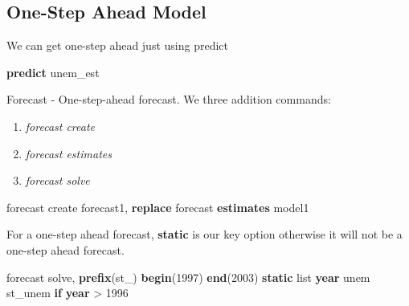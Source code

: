 \documentclass[
]{book}
\newenvironment{Shaded}{\begin{snugshade}}{\end{snugshade}}
\newcommand{\FunctionTok}[1]{\textcolor[rgb]{0.13,0.29,0.53}{\textbf{#1}}}
\newcommand{\KeywordTok}[1]{\textcolor[rgb]{0.13,0.29,0.53}{\textbf{#1}}}
\newcommand{\NormalTok}[1]{#1}
\newcommand{\OtherTok}[1]{\textcolor[rgb]{0.56,0.35,0.01}{#1}}
\providecommand{\tightlist}{%
  \setlength{\itemsep}{0pt}\setlength{\parskip}{0pt}}
\begin{document}
\subsection*{One-Step Ahead Model}\label{one-step-ahead-model}

We can get one-step ahead just using predict

\begin{Shaded}
\begin{Highlighting}[]
\KeywordTok{predict}\NormalTok{ unem\_est}
\end{Highlighting}
\end{Shaded}

Forecast - One-step-ahead forecast. We three addition commands:

\begin{enumerate}
\def\labelenumi{\arabic{enumi}.}
\tightlist
\item
  \emph{forecast create}
\item
  \emph{forecast estimates}
\item
  \emph{forecast solve}
\end{enumerate}

\begin{Shaded}
\begin{Highlighting}[]
\NormalTok{forecast create forecast1, }\KeywordTok{replace}
\NormalTok{forecast }\KeywordTok{estimates}\NormalTok{ model1}
\end{Highlighting}
\end{Shaded}

For a one-step ahead forecast, \textbf{static} is our key option otherwise it will not be a one-step ahead forecast.

\begin{Shaded}
\begin{Highlighting}[]
\NormalTok{forecast solve, }\KeywordTok{prefix}\NormalTok{(st\_) }\KeywordTok{begin}\NormalTok{(1997) }\KeywordTok{end}\NormalTok{(2003) }\KeywordTok{static}
\OtherTok{list} \FunctionTok{year}\NormalTok{ unem st\_unem }\KeywordTok{if} \FunctionTok{year}\NormalTok{ \textgreater{} 1996}
\end{Highlighting}
\end{Shaded}
\end{document}

